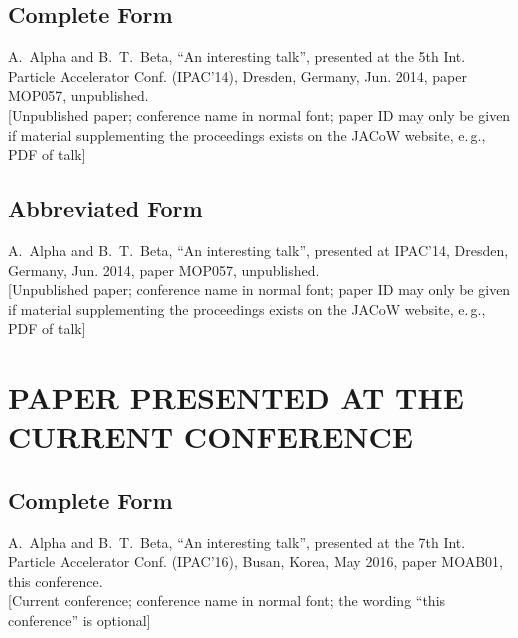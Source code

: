 \documentclass[a4paper,
              ]{jacow}
\begin{document}
\subsection{Complete Form}

\begin{thebibliography}{9} %
\setcounter{enumi}{3}
	A.~Alpha and B.~T.~Beta, 
	“An interesting talk”, 
	presented at the 5th Int. Particle Accelerator Conf. (IPAC’14), 
	Dresden, Germany, Jun. 2014, paper MOP057, unpublished.\\
	\textcolor{jred}{[Unpublished paper; conference name in normal font; paper
	ID may only be given if material supplementing the proceedings
	exists on the JACoW website, e.\,g., PDF of talk]}
\end{thebibliography}

\subsection{Abbreviated Form}

\begin{thebibliography}{9} %
\setcounter{enumi}{3}
	A.~Alpha and B.~T.~Beta, 
	“An interesting talk”, 
	presented at IPAC’14, 
	Dresden, Germany, Jun. 2014, paper MOP057, unpublished.\\
	\textcolor{jred}{[Unpublished paper; conference name in normal font; paper
	ID may only be given if material supplementing the proceedings
	exists on the JACoW website, e.\,g., PDF of talk]}
\end{thebibliography}


\section{PAPER PRESENTED AT THE CURRENT CONFERENCE}

\subsection{Complete Form}

\begin{thebibliography}{9} %
\setcounter{enumi}{4}
	A.~Alpha and B.~T.~Beta, 
	“An interesting talk”, 
	presented at the 7th Int. Particle Accelerator Conf. (IPAC’16), 
	Busan, Korea, May 2016, 
	paper MOAB01, this conference.\\
	\textcolor{jgrepc}{[Current conference; conference name in normal font; the
			           wording “this conference” is optional]}
\end{thebibliography}
\end{document}
